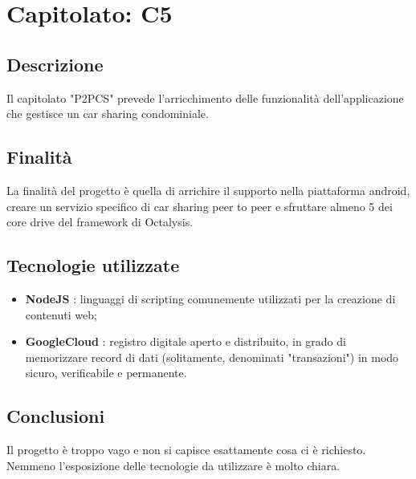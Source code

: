 \section{Capitolato: C5}
	\subsection{Descrizione}
		Il capitolato "P2PCS" prevede l'arricchimento delle funzionalità dell'applicazione che gestisce un car sharing condominiale.
	\subsection{Finalità}
		La finalità del progetto è quella di arrichire il supporto nella piattaforma android, creare un servizio specifico di car sharing peer to peer e sfruttare almeno 5 dei core drive del framework di Octalysis.
	\subsection{Tecnologie utilizzate}
		\begin{itemize}
			\item \textbf{NodeJS} : linguaggi di scripting comunemente utilizzati per la creazione di contenuti web;
			\item \textbf{GoogleCloud} : registro digitale aperto e distribuito, in grado di memorizzare record di dati (solitamente, denominati "transazioni") in modo sicuro, verificabile e permanente.
		\end{itemize}
	\subsection{Conclusioni}
		Il progetto è troppo vago e non si capisce esattamente cosa ci è richiesto. Nemmeno l'esposizione delle tecnologie da utilizzare è molto chiara.
